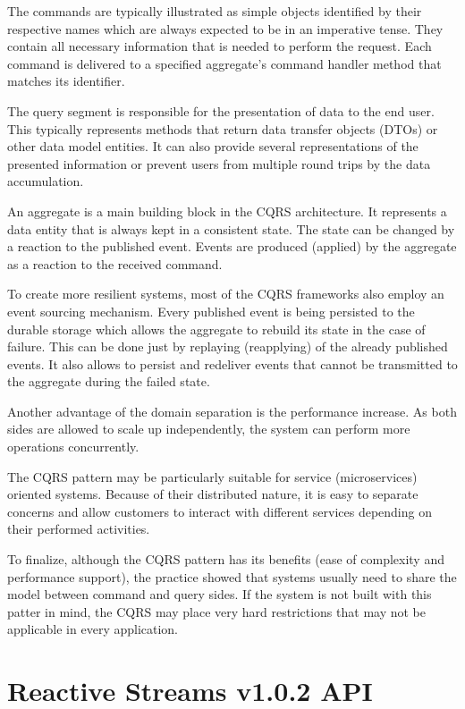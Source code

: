 \documentclass[oneside,
  digital, %
  table,   %
  lof,     %
  lot,     %
]{fithesis3}
\begin{document}
The commands are typically illustrated as simple objects identified by their respective names which are always expected to be in an imperative tense. They contain all necessary information that is needed to perform the request. Each command is delivered to a specified aggregate's command handler method that matches its identifier. 

The query segment is responsible for the presentation of data to the end user. This typically represents methods that return data transfer objects (DTOs) or other data model entities. It can also provide several representations of the presented information or prevent users from multiple round trips by the data accumulation.

An aggregate is a main building block in the CQRS architecture. It represents a data entity that is always kept in a consistent state. The state can be changed by a reaction to the published event. Events are produced (applied) by the aggregate as a reaction to the received command. 

To create more resilient systems, most of the CQRS frameworks also employ an event sourcing mechanism. Every published event is being persisted to the durable storage which allows the aggregate to rebuild its state in the case of failure. This can be done just by replaying (reapplying) of the already published events. It also allows to persist and redeliver events that cannot be transmitted to the aggregate during the failed state.

Another advantage of the domain separation is the performance increase. As both sides are allowed to scale up independently, the system can perform more operations concurrently.

The CQRS pattern may be particularly suitable for service (microservices) oriented systems. Because of their distributed nature, it is easy to separate concerns and allow customers to interact with different services depending on their performed activities.

To finalize, although the CQRS pattern has its benefits (ease of complexity and performance support), the practice showed that systems usually need to share the model between command and query sides. If the system is not built with this patter in mind, the CQRS may place very hard restrictions that may not be applicable in every application.


\clearpage
\chapter{Reactive Streams v1.0.2 API}
\label{reactive_streams}
\end{document}
